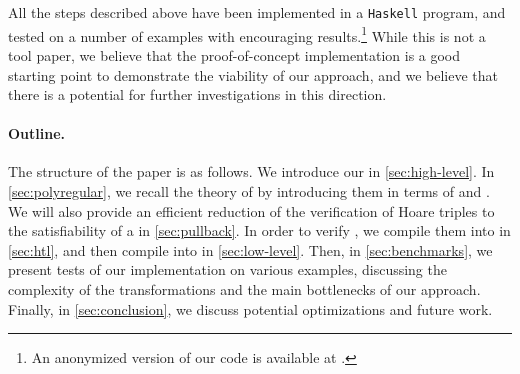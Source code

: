 All the steps described above have been implemented in a \texttt{Haskell}
program, and tested on a number of examples with encouraging
results.\footnote{An anonymized version of our code is available at
\repositoryUrl.} While this is not a tool paper, we believe that the
proof-of-concept implementation is a good starting point to demonstrate the viability of
our approach, and we believe that there is a potential for further
investigations in this direction.


\paragraph{Outline.} The structure of the paper is as follows. We introduce our
 in \cref{sec:high-level}. In \cref{sec:polyregular},
we recall the theory of  by introducing them in terms
of  and . We will also
provide an efficient reduction of the verification of Hoare triples to the
satisfiability of a  in \cref{sec:pullback}.
In order to verify , we compile them into  in \cref{sec:htl}, and then compile  into
 in \cref{sec:low-level}. 
%
Then, in \cref{sec:benchmarks}, we present
tests of our implementation on various examples, discussing
the complexity of the transformations and the main bottlenecks of our approach.
Finally,  in \cref{sec:conclusion}, we discuss potential
optimizations and future work.

